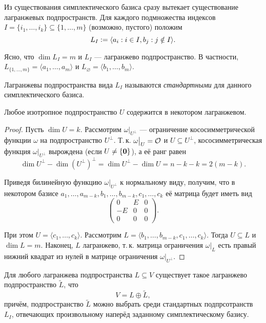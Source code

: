 Из существования симплектического базиса сразу вытекает существование лагранжевых подпространств. Для каждого подмножества индексов $I = \{i_1, \ldots, i_k\} \subseteq \{1, \ldots, m\}$ (возможно, пустого) положим
\[
    L_I \vcentcolon = \langle a_i : i \in I, b_j : j \notin I\rangle.
\]

Ясно, что $\dim L_I = m$ и $L_I$ --- лагранжево подпространство. В частности, $L_{\{1, \ldots, m\}} = \langle a_1, \ldots, a_m\rangle$ и $L_\varnothing = \langle b_1, \ldots, b_m\rangle$.

\begin{definition}
    Лагранжевы подпространства вида $L_I$ называются \textit{стандартными} для данного симплектического базиса.
\end{definition}

\begin{lemma}
    Любое изотропное подпространство $U$ содержится в некотором лагранжевом.
\end{lemma}

\begin{proof}
    Пусть $\dim U = k$. Рассмотрим $\omega\big|_{U^\perp}$ --- ограничение кососимметрической функции $\omega$ на подпространство $U^\perp$. Т.\,к. $\omega\big|_U = \mathcal{O}$ и $U \subseteq U^\perp$, кососимметрическая функция $\omega\big|_{U^\perp}$ вырождена (если $U \ne \{\boldsymbol{0}\}$), а её ранг равен
    \[
        \dim U^\perp - \dim(U^\perp)^\perp = \dim U^\perp - \dim U = n - k - k = 2(m - k).
    \]

    Приведя билинейную функцию $\omega\big|_{U^\perp}$ к нормальному виду, получим, что в некотором базисе $a_1, \ldots, a_{m - k}, b_1, \ldots, b_{m - k}, c_1, \ldots, c_k$ её матрица будет иметь вид
    \[
        \begin{pmatrix}
            0 & E & 0\\
            -E & 0 & 0\\
            0 & 0 & 0
        \end{pmatrix}.
    \]

    При этом $U = \langle c_1, \ldots, c_k\rangle$. Рассмотрим $L = \langle b_1, \ldots, b_{m - k}, c_1, \ldots, c_k\rangle$. Тогда $U \subseteq L$ и $\dim L = m$. Наконец, $L$ лагранжево, т.\,к. матрица ограничения $\omega\big|_L$ есть правый нижний квадрат из нулей в матрице ограничения $\omega\big|_{U^\perp}$.
\end{proof}

\begin{theorem}
    Для любого лагранжева подпространства $L \subseteq V$ существует такое лагранжево подпространство $\widetilde{L}$, что
    \[
        V = L \oplus \widetilde{L},
    \]
    причём, подпространство $\widetilde{L}$ можно выбрать среди стандартных подпрсотранств $L_I$, отвечающих произвольному наперёд заданному симплектическому базису.
\end{theorem}

